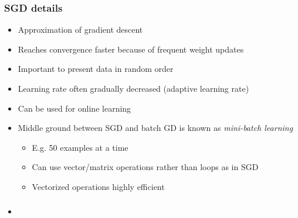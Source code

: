 \documentclass{beamer}
\begin{document}
\begin{frame}
  \frametitle{SGD details}
  \begin{itemize}
  \item Approximation of gradient descent
  \item Reaches convergence faster because of frequent weight updates
  \item Important to present data in random order
  \item Learning rate often gradually decreased (adaptive learning rate)
  \item Can be used for online learning
  \item Middle ground between SGD and batch GD is known as \emph{mini-batch learning}
    \begin{itemize}
    \item E.g. 50 examples at a time
    \item Can use vector/matrix operations rather than loops as in SGD
    \item Vectorized operations highly efficient
    \end{itemize}
  \end{itemize}
\end{frame}

\begin{frame}
  \frametitle{}
  \begin{itemize}
  \item
  \end{itemize}
\end{frame}
\end{document}
